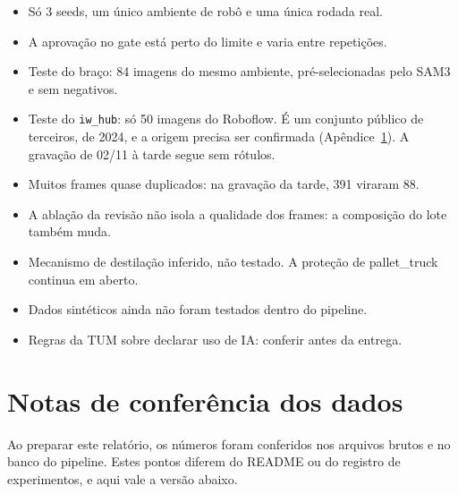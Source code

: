 \documentclass[11pt,a4paper]{article}
\begin{document}
\begin{itemize}
  \item Só 3 seeds, um único ambiente de robô e uma única rodada real.
  \item A aprovação no gate está perto do limite e varia entre repetições.
  \item Teste do braço: 84 imagens do mesmo ambiente, pré-selecionadas pelo SAM3
    e sem negativos.
  \item Teste do \texttt{iw\_hub}: só 50 imagens do Roboflow. É um conjunto
    público de terceiros, de 2024, e a origem precisa ser confirmada
    (Apêndice~\ref{ap:notas}). A gravação de 02/11 à tarde segue sem rótulos.
  \item Muitos frames quase duplicados: na gravação da tarde, 391 viraram 88.
  \item A ablação da revisão não isola a qualidade dos frames: a composição do
    lote também muda.
  \item Mecanismo de destilação inferido, não testado. A proteção de pallet\_truck
    continua em aberto.
  \item Dados sintéticos ainda não foram testados dentro do pipeline.
  \item Regras da TUM sobre declarar uso de IA: conferir antes da entrega.
\end{itemize}

\appendix

\section{Notas de conferência dos dados}
\label{ap:notas}

Ao preparar este relatório, os números foram conferidos nos arquivos brutos e no
banco do pipeline. Estes pontos diferem do README ou do registro de experimentos,
e aqui vale a versão abaixo.
\end{document}
